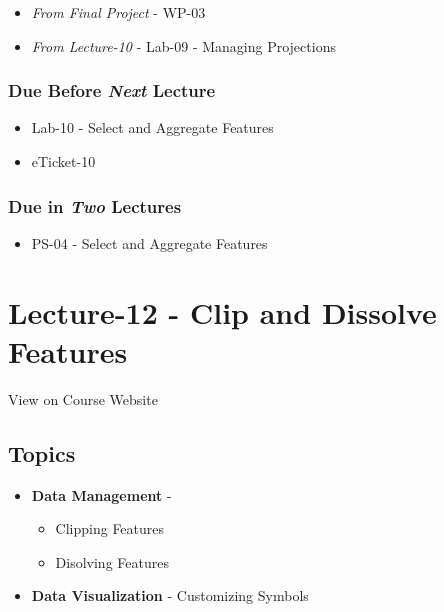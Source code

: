 \documentclass[]{book}
\providecommand{\tightlist}{%
  \setlength{\itemsep}{0pt}\setlength{\parskip}{0pt}}
\begin{document}
\begin{itemize}
\tightlist
\item
  \emph{From Final Project} - WP-03
\item
  \emph{From Lecture-10} - Lab-09 - Managing Projections
\end{itemize}

\hypertarget{due-before-next-lecture-9}{%
\subsubsection*{\texorpdfstring{Due Before \emph{Next} Lecture}{Due Before Next Lecture}}\label{due-before-next-lecture-9}}

\begin{itemize}
\tightlist
\item
  Lab-10 - Select and Aggregate Features
\item
  eTicket-10
\end{itemize}

\hypertarget{due-in-two-lectures-5}{%
\subsubsection*{\texorpdfstring{Due in \emph{Two} Lectures}{Due in Two Lectures}}\label{due-in-two-lectures-5}}

\begin{itemize}
\tightlist
\item
  PS-04 - Select and Aggregate Features
\end{itemize}

\hypertarget{lecture-12---clip-and-dissolve-features}{%
\section*{Lecture-12 - Clip and Dissolve Features}\label{lecture-12---clip-and-dissolve-features}}

View on Course Website

\hypertarget{topics-12}{%
\subsection*{Topics}\label{topics-12}}

\begin{itemize}
\tightlist
\item
  \textbf{Data Management} -

  \begin{itemize}
  \tightlist
  \item
    Clipping Features
  \item
    Disolving Features
  \end{itemize}
\item
  \textbf{Data Visualization} - Customizing Symbols
\end{itemize}
\end{document}
